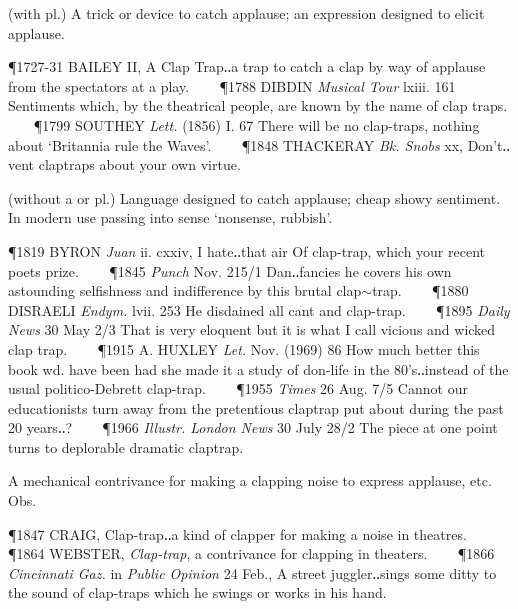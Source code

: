 \begin{description}[wide, labelwidth=!, labelindent=0pt]
\noindent {}


\vspace{-0.3cm}

\begin{myenumerate}

 (with pl.) A trick or device to catch applause; an expression designed to elicit applause.

\P 1727-31 BAILEY  II, A Clap Trap‥a trap to catch a clap by way of applause from the spectators at a play.    
\P 1788 DIBDIN  \textit{Musical Tour} lxiii. 161 Sentiments which, by the theatrical people, are known by the name of clap traps.    
\P 1799 SOUTHEY  \textit{Lett.} (1856) I. 67 There will be no clap-traps, nothing about ‘Britannia rule the Waves’.    
\P 1848 THACKERAY  \textit{Bk. Snobs} xx, Don't‥vent claptraps about your own virtue.

 (without a or pl.) Language designed to catch applause; cheap showy sentiment. In modern use passing into sense ‘nonsense, rubbish’.

\P 1819 BYRON  \textit{Juan} ii. cxxiv, I hate‥that air Of clap-trap, which your recent poets prize.    
\P 1845 \textit{Punch}  Nov. 215/1 Dan‥fancies he covers his own astounding selfishness and indifference by this brutal clap$\sim$trap.    
\P 1880 DISRAELI  \textit{Endym.} lvii. 253 He disdained all cant and clap-trap.    
\P 1895  \textit{Daily News} 30 May 2/3 That is very eloquent but it is what I call vicious and wicked clap trap.    
\P 1915 A. HUXLEY  \textit{Let.} Nov. (1969) 86 How much better this book wd. have been had she made it a study of don-life in the 80's‥instead of the usual politico-Debrett clap-trap.    
\P 1955  \textit{Times} 26 Aug. 7/5 Cannot our educationists turn away from the pretentious claptrap put about during the past 20 years‥?    
\P 1966 \textit{Illustr.  London News} 30 July 28/2 The piece at one point turns to deplorable dramatic claptrap.

 A mechanical contrivance for making a clapping noise to express applause, etc. Obs.

\P 1847 CRAIG,  Clap-trap‥a kind of clapper for making a noise in theatres.    
\P 1864 WEBSTER,  \textit{Clap-trap}, a contrivance for clapping in theaters.    
\P 1866 \textit{Cincinnati  Gaz.} in \textit{Public Opinion} 24 Feb., A street juggler‥sings some ditty to the sound of clap-traps which he swings or works in his hand.


\end{myenumerate}
\end{description}
